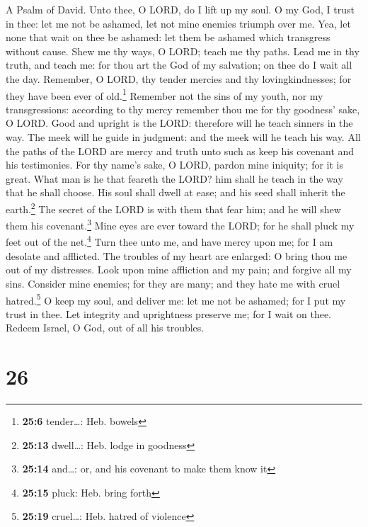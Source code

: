 A Psalm of David.  Unto thee, O LORD, do I lift up my
soul.  O my God, I trust in thee: let me not be ashamed,
let not mine enemies triumph over me.  Yea, let none that
wait on thee be ashamed: let them be ashamed which transgress without
cause.  Shew me thy ways, O LORD; teach me thy paths.
 Lead me in thy truth, and teach me: for thou art the God
of my salvation; on thee do I wait all the day.  Remember,
O LORD, thy tender mercies and thy lovingkindnesses; for they have been
ever of old.\footnote{\textbf{25:6} tender\ldots: Heb. bowels}
 Remember not the sins of my youth, nor my transgressions:
according to thy mercy remember thou me for thy goodness' sake, O LORD.
 Good and upright is the LORD: therefore will he teach
sinners in the way.  The meek will he guide in judgment:
and the meek will he teach his way.  All the paths of the
LORD are mercy and truth unto such as keep his covenant and his
testimonies.  For thy name's sake, O LORD, pardon mine
iniquity; for it is great.  What man is he that feareth
the LORD? him shall he teach in the way that he shall choose.
 His soul shall dwell at ease; and his seed shall inherit
the earth.\footnote{\textbf{25:13} dwell\ldots: Heb. lodge in goodness}
 The secret of the LORD is with them that fear him; and
he will shew them his covenant.\footnote{\textbf{25:14} and\ldots: or,
  and his covenant to make them know it}  Mine eyes are
ever toward the LORD; for he shall pluck my feet out of the
net.\footnote{\textbf{25:15} pluck: Heb. bring forth} 
Turn thee unto me, and have mercy upon me; for I am desolate and
afflicted.  The troubles of my heart are enlarged: O
bring thou me out of my distresses.  Look upon mine
affliction and my pain; and forgive all my sins. 
Consider mine enemies; for they are many; and they hate me with cruel
hatred.\footnote{\textbf{25:19} cruel\ldots: Heb. hatred of violence}
 O keep my soul, and deliver me: let me not be ashamed;
for I put my trust in thee.  Let integrity and
uprightness preserve me; for I wait on thee.  Redeem
Israel, O God, out of all his troubles.

\hypertarget{section-25}{%
\section{26}\label{section-25}}

